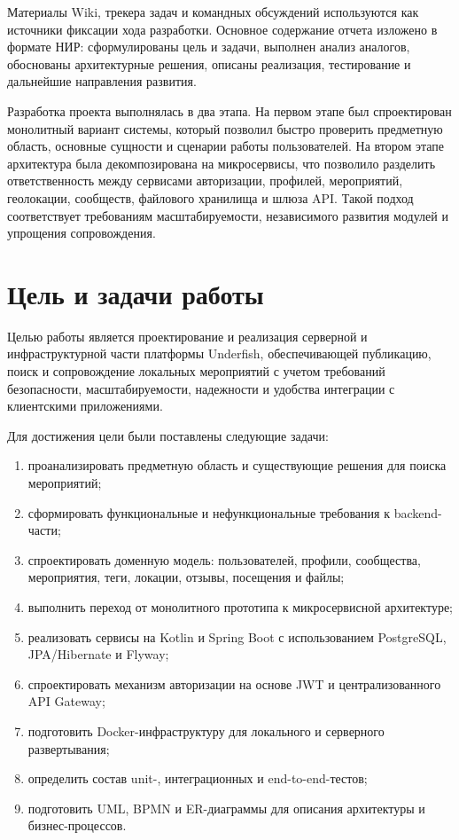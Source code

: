 Материалы Wiki, трекера задач и командных обсуждений используются как источники фиксации хода разработки. Основное содержание отчета изложено в формате НИР: сформулированы цель и задачи, выполнен анализ аналогов, обоснованы архитектурные решения, описаны реализация, тестирование и дальнейшие направления развития.

Разработка проекта выполнялась в два этапа. На первом этапе был спроектирован монолитный вариант системы, который позволил быстро проверить предметную область, основные сущности и сценарии работы пользователей. На втором этапе архитектура была декомпозирована на микросервисы, что позволило разделить ответственность между сервисами авторизации, профилей, мероприятий, геолокации, сообществ, файлового хранилища и шлюза API. Такой подход соответствует требованиям масштабируемости, независимого развития модулей и упрощения сопровождения.

\section{Цель и задачи работы}

Целью работы является проектирование и реализация серверной и инфраструктурной части платформы Underfish, обеспечивающей публикацию, поиск и сопровождение локальных мероприятий с учетом требований безопасности, масштабируемости, надежности и удобства интеграции с клиентскими приложениями.

Для достижения цели были поставлены следующие задачи:
\begin{enumerate}
    \item проанализировать предметную область и существующие решения для поиска мероприятий;
    \item сформировать функциональные и нефункциональные требования к backend-части;
    \item спроектировать доменную модель: пользователей, профили, сообщества, мероприятия, теги, локации, отзывы, посещения и файлы;
    \item выполнить переход от монолитного прототипа к микросервисной архитектуре;
    \item реализовать сервисы на Kotlin и Spring Boot с использованием PostgreSQL, JPA/Hibernate и Flyway;
    \item спроектировать механизм авторизации на основе JWT и централизованного API Gateway;
    \item подготовить Docker-инфраструктуру для локального и серверного развертывания;
    \item определить состав unit-, интеграционных и end-to-end-тестов;
    \item подготовить UML, BPMN и ER-диаграммы для описания архитектуры и бизнес-процессов.
\end{enumerate}

